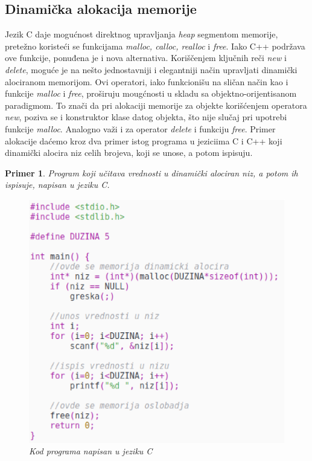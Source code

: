\documentclass[a4paper]{article}
\newtheorem{primer}{Primer}[section]
\begin{document}
{\subsection{Dinamička alokacija memorije}

Jezik C daje mogućnost direktnog upravljanja \emph{heap} segmentom memorije, pretežno koristeći se funkcijama \emph{malloc, calloc, realloc} i \emph{free}. Iako C++ podržava ove funkcije, ponuđena je i nova alternativa. Koriščenjem ključnih reči \emph{new} i \emph{delete}, moguće je na nešto jednostavniji i elegantniji način upravljati dinamički alociranom memorijom. Ovi operatori, iako funkcionišu na sličan način kao i funkcije \emph{malloc} i \emph{free}, proširuju mougćnosti u skladu sa objektno-orijentisanom paradigmom. To znači da pri alokaciji memorije za objekte korišćenjem operatora \emph{new}, poziva se i konstruktor klase datog objekta, što nije slučaj pri upotrebi funkcije \emph{malloc}. Analogno važi i za operator \emph{delete} i funkciju \emph{free}. Primer alokacije daćemo kroz dva primer istog programa u jeziciima C i C++ koji dinamički alocira niz celih brojeva, koji se unose, a potom ispisuju.

\begin{primer} Program koji učitava vrednosti u dinamički alociran niz, a potom ih ispisuje, napisan u jeziku C.

\begin{figure}[h!]
\begin{center}
\includegraphics[scale=0.4]{c_kod_dinamicka_alokacija.eps}
\end{center}
\caption{Kod programa napisan u jeziku C}
\label{fig:ckod}
\end{figure}


\end{primer}}
\end{document}
